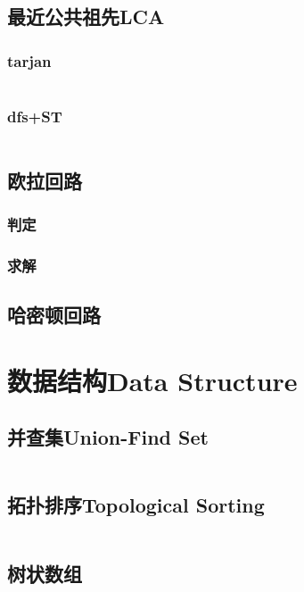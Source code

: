 \documentclass[twoside,sub3section,UTF8]{ctexart}						%
\begin{document}
	\subsection{最近公共祖先LCA}
		\subsubsection{tarjan}
		\inputminted{c++}{"Gragh Theory/LeastCommonAncestors/tarjan.cpp"}
		\subsubsection{dfs+ST}
		\inputminted{c++}{"Gragh Theory/LeastCommonAncestors/dfs+ST.cpp"}

	\subsection{欧拉回路}
		\subsubsection{判定}
		\subsubsection{求解}

	\subsection{哈密顿回路}


\newpage
\section{数据结构Data Structure}
	\subsection{并查集Union-Find Set}
		\inputminted{c++}{"Data Structure/union-find-set.cpp"}
	\subsection{拓扑排序Topological Sorting}
		\inputminted{c++}{"Data Structure/topo.cpp"}
	\subsection{树状数组}
		\inputminted{c++}{"Data Structure/BinaryIndexedTree.cpp"}
\end{document}
